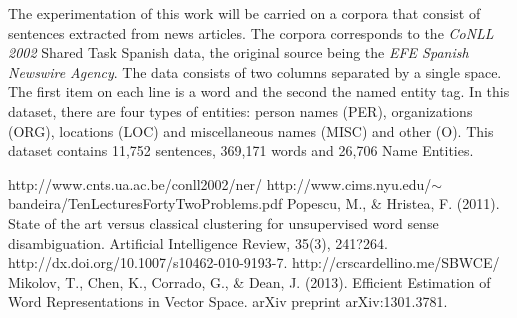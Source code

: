 \documentclass[]{article}
\begin{document}
  The experimentation of this work will be carried on a corpora that consist of sentences extracted from news articles. The corpora corresponds to the \emph{CoNLL 2002} Shared Task Spanish data, the original source being the \emph{EFE Spanish Newswire Agency}.  The data consists of two columns separated by a single space. The first item on each line is a word and the second the named entity tag. In this dataset, there are four types of entities: person names (PER), organizations (ORG), locations (LOC) and miscellaneous names (MISC) and other (O). This dataset contains 11,752 sentences, 369,171 words and 26,706 Name Entities.  
  
  
\pagestyle{myheadings}
\thispagestyle{plain}


\begin{thebibliography}{1}
   http://www.cnts.ua.ac.be/conll2002/ner/
  http://www.cims.nyu.edu/$\sim$bandeira/TenLecturesFortyTwoProblems.pdf
   Popescu, M., \& Hristea, F. (2011). State of the art versus classical clustering for unsupervised word sense disambiguation. Artificial Intelligence Review, 35(3), 241?264. http://dx.doi.org/10.1007/s10462-010-9193-7.  
   http://crscardellino.me/SBWCE/
    Mikolov, T., Chen, K., Corrado, G., \& Dean, J. (2013). Efficient Estimation of Word Representations in Vector Space. arXiv preprint arXiv:1301.3781. 
   
\end{thebibliography} 
\end{document}
